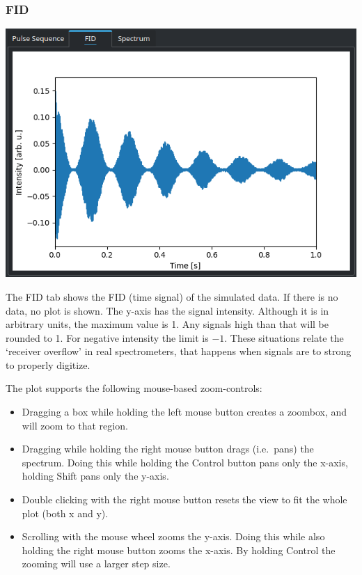 \documentclass[11pt,a4paper]{article}
\begin{document}
\subsubsection{FID}\label{sec:FID}
\begin{center}
\includegraphics[width=0.9\linewidth]{images/Plot_FID.png}
\end{center}
The FID tab shows the FID (time signal) of the simulated data. If there is no data, no plot is shown. The y-axis has the signal intensity. Although it is in arbitrary units, the maximum value is 1. Any signals high than that will be rounded to 1. For negative intensity the limit is $-1$. These situations relate the `receiver overflow' in real spectrometers, that happens when signals are to strong to properly digitize.

The plot supports the following mouse-based zoom-controls:

\begin{itemize}
\item Dragging a box while holding the left mouse button creates a zoombox, and will zoom to that region.
\item Dragging while holding the right mouse button drags (i.e.\ pans) the spectrum. Doing this while holding the Control button pans only the x-axis, holding Shift pans only the y-axis.
\item Double clicking with the right mouse button resets the view to fit the whole plot (both x and y).
\item Scrolling with the mouse wheel zooms the y-axis. Doing this while also holding the right mouse button zooms the x-axis. By holding Control the zooming will use a larger step size. 
\end{itemize}
\end{document}
